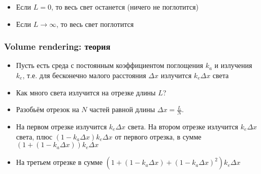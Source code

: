 \documentclass{beamer}
\begin{document}
\begin{frame}[fragile]
\begin{itemize}
\begin{itemize}
\pause
\item Если \begin{math}L = 0\end{math}, то весь свет останется (ничего не поглотится)
\item Если \begin{math}L \rightarrow \infty\end{math}, то весь свет поглотится
\end{itemize}
\end{itemize}
\end{frame}

\begin{frame}[fragile]
\frametitle{Volume rendering: теория}
\begin{itemize}
\item Пусть есть среда с постоянным коэффициентом поглощения \begin{math}k_a\end{math} и излучения \begin{math}k_e\end{math}, т.е. для бесконечно малого расстояния \begin{math}\Delta x\end{math} излучится \begin{math}k_e \Delta x\end{math} света
\pause
\item Как много света излучится на отрезке длины \begin{math}L\end{math}?
\pause
\item Разобьём отрезок на \begin{math}N\end{math} частей равной длины \begin{math}\Delta x = \frac{L}{N}\end{math}.
\pause
\item На первом отрезке излучится \begin{math}k_e \Delta x\end{math} света. На втором отрезке излучится \begin{math}k_e \Delta x\end{math} света, плюс \begin{math}(1 - k_a \Delta x) k_e \Delta x\end{math} от первого отрезка, в сумме \begin{math}\left(1 + (1 - k_a \Delta x)\right) k_e \Delta x\end{math}
\pause
\item На третьем отрезке в сумме \begin{math}\left(1 + (1 - k_a \Delta x) + (1 - k_a \Delta x)^2\right) k_e \Delta x\end{math}

\end{itemize}
\end{frame}
\end{document}
